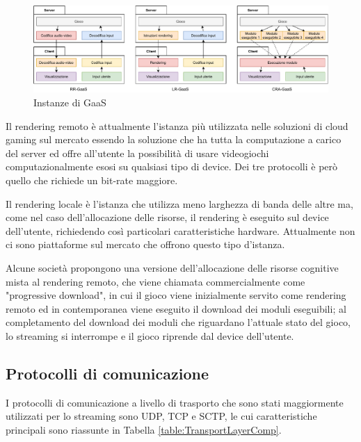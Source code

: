 \begin{figure}[H]
	\includegraphics[width=\linewidth]{immagini/GaaS}
	\caption{Instanze di GaaS}
	\label{fig:GaaS}
\end{figure}

Il rendering remoto è attualmente l'istanza più utilizzata nelle soluzioni di cloud gaming sul mercato essendo la soluzione che ha tutta la computazione a carico del server ed offre all'utente la possibilità di usare videogiochi computazionalmente esosi su qualsiasi tipo di device. Dei tre protocolli è però quello che richiede un bit-rate maggiore.

Il rendering locale è l'istanza che utilizza meno larghezza di banda delle altre ma, come nel caso dell'allocazione delle risorse, il rendering è eseguito sul device dell'utente, richiedendo così particolari caratteristiche hardware. Attualmente non ci sono piattaforme sul mercato che offrono questo tipo d'istanza.

Alcune società propongono una versione dell'allocazione delle risorse cognitive mista al rendering remoto, che viene chiamata commercialmente come "progressive download", in cui il gioco viene inizialmente servito come rendering remoto ed in contemporanea viene eseguito il download dei moduli eseguibili; al completamento del download dei moduli che riguardano l'attuale stato del gioco, lo streaming si interrompe e il gioco riprende dal device dell'utente.

\subsection{Protocolli di comunicazione}
I protocolli di comunicazione a livello di trasporto che sono stati maggiormente utilizzati per lo streaming sono UDP, TCP e SCTP, le cui caratteristiche principali sono riassunte in Tabella \ref{table:TransportLayerComp}.

